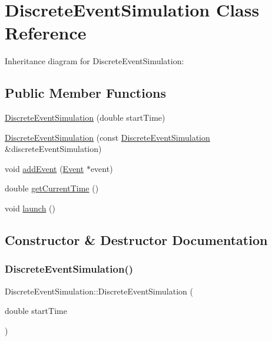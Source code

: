 \hypertarget{classDiscreteEventSimulation}{}\section{Discrete\+Event\+Simulation Class Reference}
\label{classDiscreteEventSimulation}


Inheritance diagram for Discrete\+Event\+Simulation\+:
\subsection*{Public Member Functions}
\begin{DoxyCompactItemize}
\item 
\hyperlink{classDiscreteEventSimulation_afef7ef964c3a7d151150120184c58d99}{Discrete\+Event\+Simulation} (double start\+Time)
\item 
\hyperlink{classDiscreteEventSimulation_aa92e10279fe95449f35139a4893192f5}{Discrete\+Event\+Simulation} (const \hyperlink{classDiscreteEventSimulation}{Discrete\+Event\+Simulation} \&discrete\+Event\+Simulation)
\item 
void \hyperlink{classDiscreteEventSimulation_a03770d2464931bc3555d4f34379aaa1e}{add\+Event} (\hyperlink{classEvent}{Event} $\ast$event)
\item 
double \hyperlink{classDiscreteEventSimulation_a41c5492fdf2d5ef2a9a27200871caabd}{get\+Current\+Time} ()
\item 
void \hyperlink{classDiscreteEventSimulation_aae616e227950798dc958171210975713}{launch} ()
\end{DoxyCompactItemize}


\subsection{Constructor \& Destructor Documentation}
\mbox{\label{classDiscreteEventSimulation_afef7ef964c3a7d151150120184c58d99}} 
\subsubsection{\texorpdfstring{Discrete\+Event\+Simulation()}{DiscreteEventSimulation()}\hspace{0.1cm}{\footnotesize\ttfamily [1/2]}}
{\footnotesize\ttfamily Discrete\+Event\+Simulation\+::\+Discrete\+Event\+Simulation (\begin{DoxyParamCaption}\item[{double}]{start\+Time }\end{DoxyParamCaption})\hspace{0.3cm}{\ttfamily [explicit]}}

